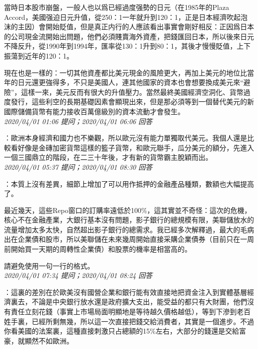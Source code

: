 \documentclass[twocolumn]{ctexart}
\begin{document}
當時日本股市崩盤，一般人也以爲已經過度强勢的日元（在1985年的Plaza Accord，美國强迫日元升值，從250：1一年就升到120：1，正是日本經濟吹起泡沫的主因）會開始貶值，但是真正内行的人應該看出事實會剛好相反：正因爲日本的公司現金流開始出問題，他們必須賤賣海外資產，把錢匯回日本，所以後來日元不降反升，從1990年到1994年，匯率從130：1升到80：1，其後才慢慢貶值，上下振蕩到近年的120：1。

現在也是一樣的：一切其他資產都比美元現金的風險更大，再加上美元的地位比當年的日元還更強得多，不只是美國人，連其他國家的資本也會想要換成美元來“避險”，這樣一來，美元反而有很大的升值壓力。當然最終美國經濟空洞化、貨幣過度發行，這些利空的長期基礎因素會顯現出來，但是那必須等到一個替代美元的新國際儲備貨幣有能力接收百萬億級別的資本流動才會發生。
\\

\textit{\hfill\noindent\small 2020/04/01 01:06 提问；2020/04/01 06:06 回答}

：歐洲本身經濟和國力也不樂觀，所以歐元沒有能力單獨取代美元。我個人還是比較看好像是金磚加密貨幣這樣的籃子貨幣，和歐元聯手，瓜分美元的額分，先進入一個三國鼎立的階段，在二三十年後，才有新的貨幣霸主脫穎而出。
\\

\textit{\hfill\noindent\small 2020/04/01 05:37 提问；2020/04/01 08:30 回答}

：本質上沒有差異，細節上增加了可以用作抵押的金融產品種類，數額也大幅提高了。

最近幾天，這些Repo窗口的訂購率遠低於100\%，這其實並不奇怪：這次的危機，核心不在金融產業，大銀行基本沒有問題，影子銀行的總規模有限，美聯儲放水的流量增加太多太快，自然超出影子銀行的總需求。我已經多次解釋過，最大的毛病出在企業債和股市，所以美聯儲在未來幾周開始直接采購企業債券（目前只在一周前開始買一天期的周轉性企業債）和股票的機率是相當高的。

請避免使用一句一行的格式。
\\

\textit{\hfill\noindent\small 2020/04/01 07:34 提问；2020/04/01 08:24 回答}

：這裏的差別在於歐美沒有國營企業和銀行能有效直接地把資金注入到實體基層經濟裏去，不論是中央銀行放水還是政府擴大支出，能受益的都只有大財團，他們沒有責任立刻花錢（事實上市場局面明顯地是等待越久價格越低），等到下滲到老百姓手裏，已經所剩無幾，所以這一次直接把錢交給消費者，其實是一個進步。不過你看美國的法案裏，這種直接刺激只占總額的15\%左右，大部分的錢還是交給富豪，就顯然不如歐洲。
\\
\end{document}
